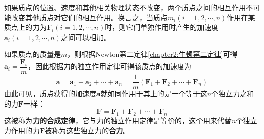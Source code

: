 \begin{law}[力的独立作用定律]
	如果质点的位置、速度和其他相关物理状态不改变，两个质点之间的相互作用不可能改变其他质点对它们的相互作用。换言之，当质点$m_i(i=1,2,\cdots,n)$作用在某质点上的力为$\boldsymbol{F}_i(i=1,2,\cdots,n)$时，则它们单独作用时产生的加速度$\boldsymbol{a}_i(i=1,2,\cdots,n)$之间可以相加。
\end{law}

如果质点的质量是$m$，则根据Newton第二定律\eqref{chapter2:牛顿第二定律}可得$\boldsymbol{a}_i = \dfrac{\boldsymbol{F}_i}{m}$，因此根据力的独立作用定律可得该质点的加速度为
\begin{equation}
	\boldsymbol{a} = \boldsymbol{a}_1 + \boldsymbol{a}_2 + \cdots + \boldsymbol{a}_n = \frac{1}{m}\left(\boldsymbol{F}_1 + \boldsymbol{F}_2 + \cdots + \boldsymbol{F}_n\right)
\end{equation}
由此可见，质点获得的加速度$\boldsymbol{a}$就如同作用于其上的是一个等于这$n$个独立力之和的力$\boldsymbol{F}$一样：
\begin{equation}
	\boldsymbol{F} = \boldsymbol{F}_1 + \boldsymbol{F}_2 + \cdots + \boldsymbol{F}_n
\end{equation}
这被称为{\bf 力的合成定律}，它与力的独立作用定律是等价的，这个用来代替$n$个独立力作用的力$\boldsymbol{F}$被称为这些独立力的{\bf 合力}。

